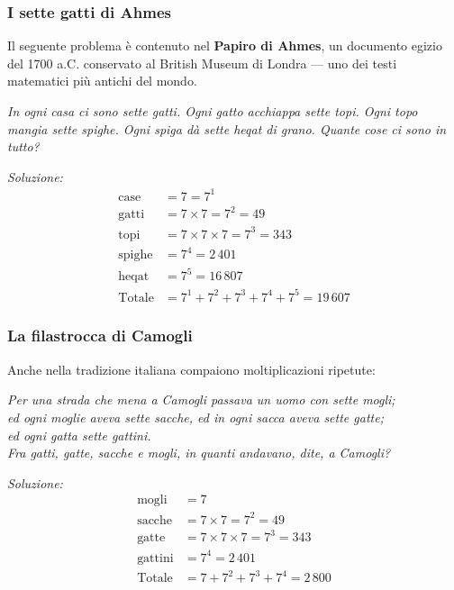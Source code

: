\subsubsection*{I sette gatti di Ahmes}

Il seguente problema è contenuto nel \textbf{Papiro di Ahmes}, un documento egizio
del 1700 a.C. conservato al British Museum di Londra — uno dei testi matematici
più antichi del mondo.

\begin{esempio}
  \textit{In ogni casa ci sono sette gatti.
    Ogni gatto acchiappa sette topi.
    Ogni topo mangia sette spighe.
    Ogni spiga dà sette heqat di grano.
    Quante cose ci sono in tutto?}

  \textit{Soluzione:}
  \begin{align*}
    \text{case}   & = 7 = 7^1                               \\
    \text{gatti}  & = 7 \times 7 = 7^2 = 49                 \\
    \text{topi}   & = 7 \times 7 \times 7 = 7^3 = 343       \\
    \text{spighe} & = 7^4 = 2\,401                          \\
    \text{heqat}  & = 7^5 = 16\,807                         \\[4pt]
    \text{Totale} & = 7^1 + 7^2 + 7^3 + 7^4 + 7^5 = 19\,607
  \end{align*}
\end{esempio}

\subsubsection*{La filastrocca di Camogli}

Anche nella tradizione italiana compaiono moltiplicazioni ripetute:

\begin{center}
  \textit{Per una strada che mena a Camogli passava un uomo con sette mogli;}\\
  \textit{ed ogni moglie aveva sette sacche, ed in ogni sacca aveva sette gatte;}\\
  \textit{ed ogni gatta sette gattini.}\\[4pt]
  \textit{Fra gatti, gatte, sacche e mogli, in quanti andavano, dite, a Camogli?}
\end{center}

\begin{esempio}
  \textit{Soluzione:}
  \begin{align*}
    \text{mogli}   & = 7                               \\
    \text{sacche}  & = 7 \times 7 = 7^2 = 49           \\
    \text{gatte}   & = 7 \times 7 \times 7 = 7^3 = 343 \\
    \text{gattini} & = 7^4 = 2\,401                    \\[4pt]
    \text{Totale}  & = 7 + 7^2 + 7^3 + 7^4 = 2\,800
  \end{align*}
\end{esempio}

